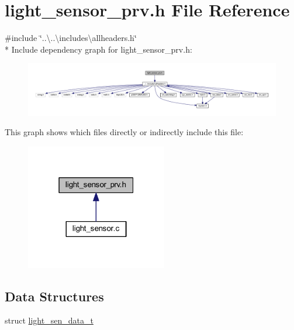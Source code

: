 \hypertarget{a00024}{\section{light\+\_\+sensor\+\_\+prv.\+h File Reference}
\label{a00024}
}
{\ttfamily \#include \char`\"{}..\textbackslash{}..\textbackslash{}includes\textbackslash{}allheaders.\+h\char`\"{}}\\*
Include dependency graph for light\+\_\+sensor\+\_\+prv.\+h\+:\nopagebreak
\begin{figure}[H]
\begin{center}
\leavevmode
\includegraphics[width=350pt]{d6/dad/a00941}
\end{center}
\end{figure}
This graph shows which files directly or indirectly include this file\+:\nopagebreak
\begin{figure}[H]
\begin{center}
\leavevmode
\includegraphics[width=175pt]{df/d12/a00942}
\end{center}
\end{figure}
\subsection*{Data Structures}
\begin{DoxyCompactItemize}
\item 
struct \hyperlink{a00024_d8/d2e/a00588}{light\+\_\+sen\+\_\+data\+\_\+t}
\end{DoxyCompactItemize}
